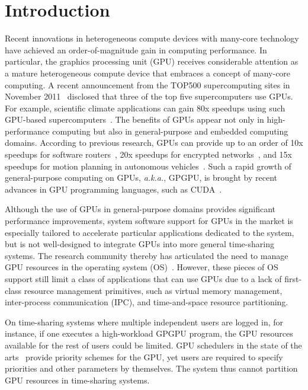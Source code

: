 \vspace{-1em}
\section{Introduction}
\label{sec:introduction}
\vspace{-0.25em}

Recent innovations in heterogeneous compute devices with many-core
technology have achieved an order-of-magnitude gain in computing
performance. 
In particular, the graphics processing unit (GPU) receives considerable
attention as a mature heterogeneous compute device that embraces a
concept of many-core computing.
A recent announcement from the TOP500 supercomputing sites in November
2011~\cite{TOP500} disclosed that three of the top five supercomputers
use GPUs.
For example, scientific climate applications can gain 80x speedups using
such GPU-based supercomputers~\cite{Shimokawabe10}.
The benefits of GPUs appear not only in high-performance computing but
also in general-purpose and embedded computing domains.
According to previous research, GPUs can provide up to an order of 10x
speedups for software routers~\cite{Han_SIGCOMM10}, 20x speedups for
encrypted networks~\cite{Jang_NSDI11}, and 15x speedups for motion
planning in autonomous vehicles~\cite{McNaughton_ICRA11}.
Such a rapid growth of general-purpose computing on GPUs,
\textit{a.k.a.}, GPGPU, is brought by recent advances in GPU
programming languages, such as CUDA~\cite{CUDA40}.

Although the use of GPUs in general-purpose domains provides significant
performance improvements, system software support for GPUs in the market
is especially  tailored to accelerate particular applications dedicated
to the system, but is not well-designed to integrate GPUs into more
general time-sharing systems.
The research community thereby has articulated the need to manage GPU
resources in the operating system (OS)~\cite{Bautin_MCNC08, Kato_ATC11,
Rossbach_SOSP11}.
However, these pieces of OS support still limit a class of applications
that can use GPUs due to a lack of first-class resource management
primitives, such as virtual memory management, inter-process
communication (IPC), and time-and-space resource partitioning.

On time-sharing systems where multiple independent users are logged in,
for instance, if one executes a high-workload GPGPU program, the
GPU resources available for the rest of users could be limited.
GPU schedulers in the state of the arts~\cite{Kato_ATC11,
Rossbach_SOSP11} provide priority schemes for the GPU, yet users
are required to specify priorities and other parameters by themselves.
The system thus cannot partition GPU resources in time-sharing systems.

